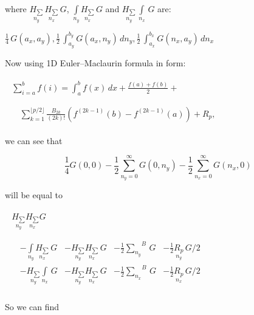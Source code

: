 \documentclass[twoside, 10pt]{article}
\begin{document}
\begin{multicols}{2}
    where \(\underset{n_y}{H_{\sum}}\,\underset{n_x}{H_{\sum}}\,G\),
\(\int\limits_{n_y}^{} \underset{n_x}{H_{\sum}}\,G\) and
\(\underset{n_y}{H_{\sum}}\,\int\limits_{n_x}^{}\,G\) are:

\noindent
    \(\frac{1}{4} \, G\left(a_{x}, a_{y}\right) , \frac{1}{2} \, \int_{a_{y}}^{b_{y}} G\left(a_{x}, n_{y}\right)\,{d n_{y}} , \frac{1}{2} \, \int_{a_{x}}^{b_{x}} G\left(n_{x}, a_{y}\right)\,{d n_{x}}\)

    Now using 1D Euler--Maclaurin formula in form:

\noindent
$\begin{array}{l}
\begin{array}{ll}
\displaystyle \sum _{i=a}^{b}f(i)=\int _{a}^{b}f(x)\,dx+{\frac {f(a)+f(b)}{2}}+ & \, \\
\end{array} \\
\begin{array}{rr}
\, &
\sum _{k=1}^{\lfloor p/2\rfloor }{\frac {B_{2k}}{(2k)!}}(f^{(2k-1)}(b)-f^{(2k-1)}(a))+R_{p},
\end{array}
\end{array}$

    we can see that

    \[
\frac{1}{4}G\left(0, 0\right)
- \frac{1}{2}\sum\limits_{n_y=0}^{\infty}{G\left(0, n_y\right)}
- \frac{1}{2}\sum\limits_{n_x=0}^{\infty}{G\left(n_x, 0\right)}
\]

    will be equal to

\noindent
\(\begin{array}{l}
    \begin{array}{l}
  \underset{n_y}{H_{\sum}} \underset{n_x}{H_{\sum}} G \\
\end{array} \\
\begin{array}{rrrrr}
  \, &  - \int\limits_{n_y}^{} \underset{n_x}{H_{\sum}}\,G &  - \underset{n_y}{H_{\sum}} \underset{n_x}{H_{\sum}}\,G &  - \frac{1}{2}{\sum\limits_{n_y}^{}}^{B}\,G &  - \frac{1}{2}\underset{n_y}{R_{p}}\,G/2 \\
  \,&  - \underset{n_y}{H_{\sum}}\int\limits_{n_x}^{} \,G &  - \underset{n_y}{H_{\sum}} \underset{n_x}{H_{\sum}}\,G &  - \frac{1}{2}{\sum\limits_{n_x}^{}}^{B}\,G &  - \frac{1}{2}\underset{n_x}{R_{p}}\,G/2 \\
\end{array}
\end{array}\)

    So we can find


\end{multicols}
\end{document}
